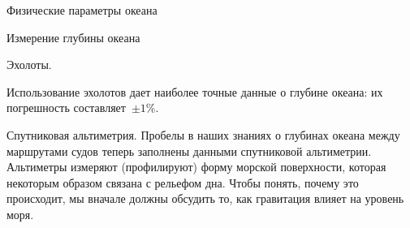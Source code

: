 \begin{chapter}{Физические параметры океана}
\begin{section}{Измерение глубины океана}
\begin{paragraph}{Эхолоты.}

Использование эхолотов дает наиболее точные данные о глубине океана:
их погрешность составляет~$\pm1$\%.
\end{paragraph}

\begin{paragraph}{Спутниковая альтиметрия.}
Пробелы в наших знаниях о глубинах океана между маршрутами судов
теперь заполнены данными спутниковой альтиметрии. Альтиметры измеряют
(профилируют) форму морской поверхности, которая некоторым образом 
связана с рельефом дна. Чтобы понять, почему это
происходит, мы вначале должны обсудить то, как гравитация влияет на
уровень моря.
%


\end{paragraph}
\end{section}
\end{chapter}
